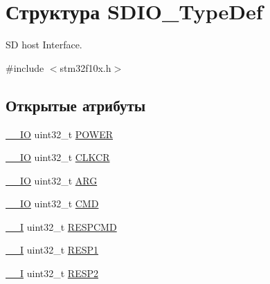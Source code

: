 \hypertarget{struct_s_d_i_o___type_def}{}\section{Структура S\+D\+I\+O\+\_\+\+Type\+Def}
\label{struct_s_d_i_o___type_def}


SD host Interface.  




{\ttfamily \#include $<$stm32f10x.\+h$>$}

\subsection*{Открытые атрибуты}
\begin{DoxyCompactItemize}
\item 
\mbox{\hyperlink{group___c_m_s_i_s___c_m3__core__definitions_gaec43007d9998a0a0e01faede4133d6be}{\+\_\+\+\_\+\+IO}} uint32\+\_\+t \mbox{\hyperlink{struct_s_d_i_o___type_def_a7c156bc55f6d970a846a459d57a9e940}{P\+O\+W\+ER}}
\item 
\mbox{\hyperlink{group___c_m_s_i_s___c_m3__core__definitions_gaec43007d9998a0a0e01faede4133d6be}{\+\_\+\+\_\+\+IO}} uint32\+\_\+t \mbox{\hyperlink{struct_s_d_i_o___type_def_aeb1e30ce2038628e45264f75e5e926bb}{C\+L\+K\+CR}}
\item 
\mbox{\hyperlink{group___c_m_s_i_s___c_m3__core__definitions_gaec43007d9998a0a0e01faede4133d6be}{\+\_\+\+\_\+\+IO}} uint32\+\_\+t \mbox{\hyperlink{struct_s_d_i_o___type_def_a3e24392875e98cd09043e54a0990ab7a}{A\+RG}}
\item 
\mbox{\hyperlink{group___c_m_s_i_s___c_m3__core__definitions_gaec43007d9998a0a0e01faede4133d6be}{\+\_\+\+\_\+\+IO}} uint32\+\_\+t \mbox{\hyperlink{struct_s_d_i_o___type_def_abbbdc3174e12dab21123d746d65f345d}{C\+MD}}
\item 
\mbox{\hyperlink{group___c_m_s_i_s___c_m3__core__definitions_gaf63697ed9952cc71e1225efe205f6cd3}{\+\_\+\+\_\+I}} uint32\+\_\+t \mbox{\hyperlink{struct_s_d_i_o___type_def_a9d881ed6c2fdecf77e872bcc6b404774}{R\+E\+S\+P\+C\+MD}}
\item 
\mbox{\hyperlink{group___c_m_s_i_s___c_m3__core__definitions_gaf63697ed9952cc71e1225efe205f6cd3}{\+\_\+\+\_\+I}} uint32\+\_\+t \mbox{\hyperlink{struct_s_d_i_o___type_def_a2b6f1ca5a5a50f8ef5417fe7be22553c}{R\+E\+S\+P1}}
\item 
\mbox{\hyperlink{group___c_m_s_i_s___c_m3__core__definitions_gaf63697ed9952cc71e1225efe205f6cd3}{\+\_\+\+\_\+I}} uint32\+\_\+t \mbox{\hyperlink{struct_s_d_i_o___type_def_a9228c8a38c07c508373644220dd322f0}{R\+E\+S\+P2}}

\end{DoxyCompactItemize}
